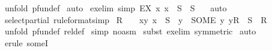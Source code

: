 \begin{isabellebody}
%
\isadelimproof
%
\endisadelimproof
%
\isatagproof
{}\isamarkupfalse%
\ {\isacharparenleft}unfold\ pfun{\isacharunderscore}def{\isacharparenright}\isanewline
{}\isamarkupfalse%
\ auto\isanewline
{}\isamarkupfalse%
%
\endisatagproof
{\isafoldproof}%
%
\isadelimproof
\isanewline
%
\endisadelimproof
\isanewline
\isanewline
\isanewline
{}\isamarkupfalse%
\ ex{\isacharunderscore}elim{}\ {\isacharbrackleft}simp{\isacharbrackright}{\isacharcolon}\ {\isachardoublequoteopen}{\isacharparenleft}EX\ x{\isachardot}\ x\ {\isacharcolon}\ S{\isacharparenright}\ {\isacharequal}\ {\isacharparenleft}S\ {\isachartilde}{\isacharequal}\ {\isacharbraceleft}{\isacharbraceright}{\isacharparenright}{\isachardoublequoteclose}\isanewline
%
\isadelimproof
%
\endisadelimproof
%
\isatagproof
{}\isamarkupfalse%
\ auto\isanewline
{}\isamarkupfalse%
%
\endisatagproof
{\isafoldproof}%
%
\isadelimproof
\isanewline
%
\endisadelimproof
\isanewline
\isanewline
{}\isamarkupfalse%
\ select{\isacharunderscore}partial\ {\isacharbrackleft}rule{\isacharunderscore}format{\isacharcomma}simp{\isacharbrackright}{\isacharcolon}\ \isanewline
{\isachardoublequoteopen}R\ {\isachartilde}{\isacharequal}\ {\isacharbraceleft}{\isacharbraceright}\ {\isacharminus}{\isacharminus}{\isachargreater}\ {\isacharbraceleft}{\isacharparenleft}x{\isacharcomma}y{\isacharparenright}{\isachardot}\ x\ {\isacharcolon}\ S\ {\isacharampersand}\ y\ {\isacharequal}\ {\isacharparenleft}SOME\ y{\isachardot}\ y{\isacharcolon}R{\isacharparenright}{\isacharbraceright}\ {\isacharcolon}\ {\isacharparenleft}S\ {\isacharminus}{\isacharbar}{\isacharminus}{\isachargreater}\ R{\isacharparenright}{\isachardoublequoteclose}\isanewline
%
\isadelimproof
%
\endisadelimproof
%
\isatagproof
{}\isamarkupfalse%
\ {\isacharparenleft}unfold\ pfun{\isacharunderscore}def\ rel{\isacharunderscore}def{\isacharparenright}\isanewline
{}\isamarkupfalse%
\ {\isacharparenleft}simp\ {\isacharparenleft}no{\isacharunderscore}asm{\isacharparenright}{\isacharparenright}\isanewline
{}\isamarkupfalse%
\ {\isacharparenleft}subst\ ex{\isacharunderscore}elim{}\ {\isacharbrackleft}symmetric{\isacharbrackright}{\isacharparenright}\isanewline
{}\isamarkupfalse%
\ auto\isanewline
{}\isamarkupfalse%
\ {\isacharparenleft}erule\ someI{\isacharparenright}\isanewline
{}\isamarkupfalse%
%
\endisatagproof
{\isafoldproof}%
%
\isadelimproof
\isanewline
%
\endisadelimproof

\end{isabellebody}
